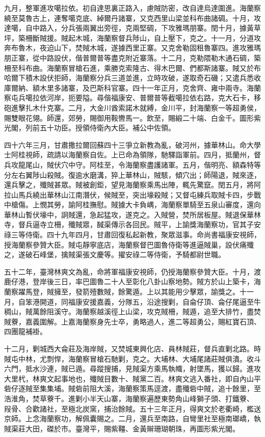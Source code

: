 \begin{pinyinscope}
九月，整軍進攻噶拉依。初自達思裏正路入，慮賊防密，改自達烏達圍進。海蘭察繞至莫魯古上，連奪噶克底、綽爾丹諸寨，又克西里山梁並科布曲諸碉。十月，攻達噶，自中路入，分兵張兩翼出旁徑，克兩堅碉，下攻雅瑪朋寨。閏十月，據黃草坪，築柵斷賊援。賊起木城，海蘭察督兵陟山，自上壓下，克之。十一月，分道攻奔布魯木，夜迫山下，焚賊木城，遂據西里正寨。又克舍勒固租魯寨四。進攻雅瑪朋正寨，從中路設伏，偕普爾普等盡克附近寨落。十二月，克勒隈勒木通石碉，築柵至科布曲。海蘭察冒槍石進，乘勝克索隆古、得木巴爾、們都斯諸寨。賊又於布哈爾下積木設伏拒師，海蘭察分兵三道並進，立時攻破，遂取奇石磯；又遣兵悉收庫爾納、額木里多諸寨，及巴斯科官寨。四十一年正月，克舍齊、雍中兩寺。海蘭察屯兵噶拉依河岸，扼要隘。尋偕福康安、普爾普等截噶拉依右路，克大石卡，移砲進擊扎木什克寨。二月，大金川酋索諾木就縛，金川平，封海蘭察一等超勇侯，賜雙眼花翎。師還，郊勞，賜御用鞍轡馬一。飲至，賜緞二十端、白金千。圖形紫光閣，列前五十功臣。授領侍衛內大臣。補公中佐領。

四十六年三月，甘肅撒拉爾回蘇四十三爭立新教為亂，破河州，據華林山。命大學士阿桂視師，疏請以海蘭察自佐。上已命為領隊，馳驛詣軍前。四月，抵蘭州，督兵攻龍尾山，賊伏穴中守。阿桂至，令海蘭察盡護諸軍。五月，偕明亮、額森特等分左右翼陟山殺賊。復逾水磨溝，猝上華林山，賊駭，傾穴出；師陽退，賊來逐，還兵擊之，殲賊甚眾。賊被創鉅，望見海蘭察乘馬出陣，輒先驚竄。閏五月，將阿拉山馬兵繞出華林山江南潛伏，候賊至，突出壕殺賊；又督屯練兵取賊卡四，步戰中槍傷。上憫其勞，諭阿桂撫慰。賊據大卡負嵎，海蘭察單騎至五泉山審度，還向華林山暫伏壕中，詗賊還，急起猛攻，遂克之。入賊營，焚所居板屋。賊退保華林寺，督兵逼寺立柵，殲賊眾，馘渠傳示各回民。賊平，上諭獎海蘭察功，官其子安祿三等侍衛。四十九年四月，甘肅回復私起新教，聚眾滋事。命尚書福康安視師，授海蘭察參贊大臣。賊屯靜寧底店，海蘭察督巴圖魯侍衛等進逼賊巢，設伏痛殲之，遂破石峰堡，擒賊渠張文慶等。擢安祿二等侍衛，予騎都尉世職。

五十二年，臺灣林爽文為亂，命將軍福康安視師，仍授海蘭察參贊大臣。十月，渡鹿仔港，登岸後三日，率巴圖魯二十人至彰化八卦山察地勢。賊方於山上築卡，海蘭察躍馬登，賊擁至，發箭殪數賊，餘驚遁。上以其能用少擊眾，諭獎之。十一月，自笨港開道，同福康安援嘉義，分隊五，沿途搜剿，自侖仔頂、侖仔尾逼至牛稠山，賊萬餘阻溪守。海蘭察越溪徑上山梁，攻克賊柵，賊遁，追至大排竹，盡焚賊藔，嘉義圍解。上嘉海蘭察身先士卒，勇略過人，進二等超勇公，賜紅寶石頂、四團龍補褂。

十二月，剿城西大侖莊及海岸賊，又焚城東興化店、員林賊莊，督兵直剿北路。時賊屯中林，尤剽悍，海蘭察冒槍石馳剿，克之。大埔林、大埔尾諸莊賊俱潰。收斗六門，抵水沙連，賊已遁。尋蹤搜捕，見賊渠方乘馬執幟，射墜馬，獲以歸。進攻大里杙，林爽文起事地也，殲賊目數十、賊黨二百。林爽文逃入番社，即自內山平砦仔逐賊至集集埔。賊砦前阻大溪，海蘭察策馬逕渡，盡殲砦中賊，追十餘里，至浩淮角，焚草藔千。進剿小半天山寨，海蘭察遍歷東勢角山峰獅子頭、打鐵藔、叚骨、合歡諸社，至極北炭窯，捕治餘賊。五十三年正月，得爽文於老衢崎，檻送京師。上念海蘭察功，解佩囊賜之。二月，還兵至南路，自彎里社至極南瑯嶠，執賊渠莊大田，磔於市。臺灣平，賜紫韁、金黃辮珊瑚朝珠，再圖形紫光閣。


\end{pinyinscope}
